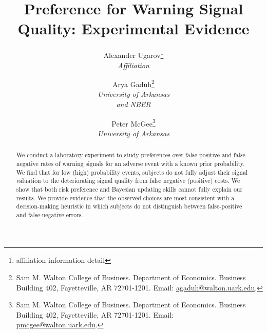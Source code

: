 \documentclass[12pt,a4paper]{article}
\title{\Large Preference for Warning Signal Quality: Experimental Evidence\\}
\author{Alexander Ugarov\thanks{affiliation information detail} \\
{\small \textit{Affiliation}}
\and Arya Gaduh\thanks{Sam M. Walton College of Business. Department of Economics. Business Building 402, Fayetteville, AR 72701-1201. Email: \href{mailto:agaduh@walton.uark.edu}{agaduh@walton.uark.edu}.} \\
{\small \textit{University of Arkansas}}\\
{\small \textit{and NBER}} 
\and Peter McGee\thanks{Sam M. Walton College of Business. Department of Economics. Business Building 402, Fayetteville, AR 72701-1201. Email: \href{mailto:pmcgee@walton.uark.edu}{pmcgee@walton.uark.edu}.} \\
{\small \textit{University of Arkansas}} 
}
\begin{document}
\maketitle
\onehalfspacing
\begin{abstract}{
\noindent We conduct a laboratory experiment to study preferences over false-positive and false-negative rates of warning signals for an adverse event with a known prior probability. We find that for low (high) probability events, subjects do not fully adjust their signal valuation to the deteriorating signal quality from false negative (positive) costs. We show that both risk preference and Bayesian updating skills cannot fully explain our results. We provide evidence that the observed choices are most consistent with a decision-making heuristic in which subjects do not distinguish between false-positive and false-negative errors. 
}


\vspace{10pt}
\begin{singlespace}

\end{singlespace}
\end{abstract}

\vspace{180pt}
\newpage
\normalsize
\end{document}
